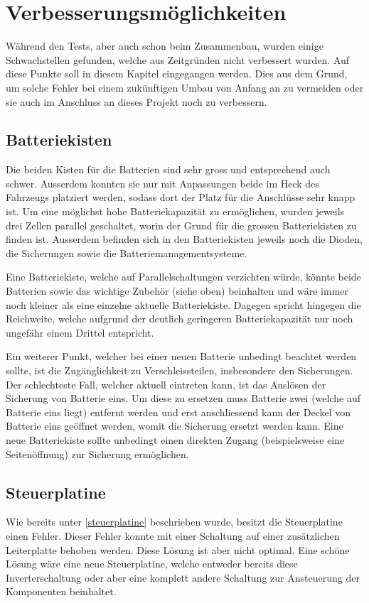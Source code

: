 \section{Verbesserungsmöglichkeiten}
\color{blue}
Während den Tests, aber auch schon beim Zusammenbau, wurden einige Schwachstellen gefunden, welche aus Zeitgründen nicht verbessert wurden. Auf diese Punkte soll in diesem Kapitel eingegangen werden. Dies aus dem Grund, um solche Fehler bei einem zukünftigen Umbau von Anfang an zu vermeiden oder sie auch im Anschluss an dieses Projekt noch zu verbessern. 

\subsection{Batteriekisten}
Die beiden Kisten für die Batterien sind sehr gross und entsprechend auch schwer. Ausserdem konnten sie nur mit Anpassungen beide im Heck des Fahrzeugs platziert werden, sodass dort der Platz für die Anschlüsse sehr knapp ist. Um eine möglichst hohe Batteriekapazität zu ermöglichen, wurden jeweils drei Zellen parallel geschaltet, worin der Grund für die grossen Batteriekisten zu finden ist. Ausserdem befinden sich in den Batteriekisten jeweils noch die Dioden, die Sicherungen sowie die Batteriemanagementsysteme.

Eine Batteriekiste, welche auf Parallelschaltungen verzichten würde, könnte beide Batterien sowie das wichtige Zubehör (siehe oben) beinhalten und wäre immer noch kleiner als eine einzelne aktuelle Batteriekiste. Dagegen spricht hingegen die Reichweite, welche aufgrund der deutlich geringeren Batteriekapazität nur noch ungefähr einem Drittel entspricht. 

Ein weiterer Punkt, welcher bei einer neuen Batterie unbedingt beachtet werden sollte, ist die Zugänglichkeit zu Verschleissteilen, insbesondere den Sicherungen. Der schlechteste Fall, welcher aktuell eintreten kann, ist das Auslösen der Sicherung von Batterie eins. Um diese zu ersetzen muss Batterie zwei (welche auf Batterie eins liegt) entfernt werden und erst anschliessend kann der Deckel von Batterie eins geöffnet werden, womit die Sicherung ersetzt werden kann. Eine neue Batteriekiste sollte unbedingt einen direkten Zugang (beispielsweise eine Seitenöffnung) zur Sicherung ermöglichen.

\subsection{Steuerplatine}
Wie bereits unter \ref{steuerplatine} beschrieben wurde, besitzt die Steuerplatine einen Fehler. Dieser Fehler konnte mit einer Schaltung auf einer zusätzlichen Leiterplatte behoben werden. Diese Lösung ist aber nicht optimal. Eine schöne Lösung wäre eine neue Steuerplatine, welche entweder bereits diese Inverterschaltung oder aber eine komplett andere Schaltung zur Ansteuerung der Komponenten beinhaltet.

